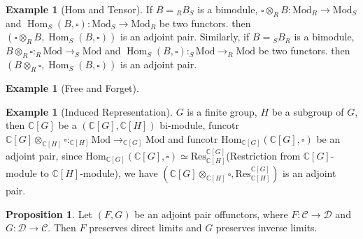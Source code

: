 \documentclass[a4paper,12pt]{article}
\newcommand{\bb}[1]{\mathbb{#1}}
\theoremstyle{definition}
\newtheorem{prop}[defn]{Proposition}
\newtheorem{exam}[defn]{Example}
\begin{document}
\begin{exam}[Hom and Tensor]
    If $B={ }_R B_S$ is a bimodule, $\square \otimes_R B:\text{Mod}_R\rightarrow \text{Mod}_S$ and $\operatorname{Hom}_S(B, \square):\text{Mod}_S\rightarrow \text{Mod}_R$ be two functors.
    then $\left(\square \otimes_R B, \operatorname{Hom}_S(B, \square)\right)$ is an adjoint pair. Similarly, if $B={ }_S B_R$ is a bimodule,
    $B \otimes_R \square: _R\text{Mod}\rightarrow _S\text{Mod}$ and $\operatorname{Hom}_S(B, \square):  _S\text{Mod}\rightarrow _R\text{Mod}$ be two functors.
    then $\left(B \otimes_R \square, \operatorname{Hom}_S(B, \square)\right)$ is an adjoint pair.
\end{exam}
\begin{exam}[Free and Forget]

\end{exam}
\begin{exam}[Induced Representation]
    $G$ is a finite group, $H$ be a subgroup of $G$, then $\bb{C}[G]$ be a $(\bb{C}[G],\bb{C}[H])$ bi-module, funcotr $\bb{C}[G]\otimes_{\bb{C}[H]}\square: _{\bb{C}[H]}\text{Mod}\rightarrow _{\bb{C}[G]}\text{Mod}$ and funcotr $\text{Hom}_{\bb{C}[G]}(\bb{C}[G],\square)$ be an adjoint pair,
    since $\text{Hom}_{\bb{C}[G]}(\bb{C}[G],\square)\simeq \text{Res}^{\bb{C}[G]}_{\bb{C}[H]}$(Restriction from $\bb{C}[G]$-module to $\bb{C}[H]$-module), we have $(\bb{C}[G]\otimes_{\bb{C}[H]}\square,\text{Res}^{\bb{C}[G]}_{\bb{C}[H]})$ is an adjoint pair.
\end{exam}
\begin{prop}
    Let $(F, G)$ be an adjoint pair offunctors, where $F: \mathcal{C} \rightarrow \mathcal{D}$ and $G: \mathcal{D} \rightarrow \mathcal{C}$. Then $F$ preserves direct limits and $G$ preserves inverse limits.
\end{prop}





\newpage
\end{document}
